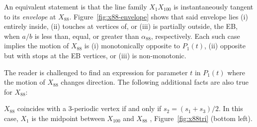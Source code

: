 An equivalent statement is that the line family $X_1X_{100}$ is instantaneously tangent to its {\em envelope} \cite{mw} at $X_{88}$. Figure~\ref{fig:x88-envelope} shows that said envelope lies (i) entirely inside, (ii) touches at vertices of, or (iii) is partially outside, the EB, when $a/b$ is less than, equal, or greater than $\alpha_{88}$, respectively. Each such case implies the motion of $X_{88}$ is (i) monotonically opposite to $P_1(t)$, (ii) opposite but with stops at the EB vertices, or (iii) is non-monotonic.

The reader is challenged to find an expression for parameter $t$ in $P_1(t)$ where the motion of $X_{88}$ changes direction. The following additional facts are also true for $X_{88}$:

\begin{proposition}\label{prop:x88}
$X_{88}$ coincides with a 3-periodic vertex if and only if $s_2 = (s_1+s_3)/2$. In this case, $X_1$ is the midpoint between $X_{100}$ and $X_{88}$ \cite{helman2020-private-x88}, Figure~\ref{fig:x88tri} (bottom left).
\end{proposition}

